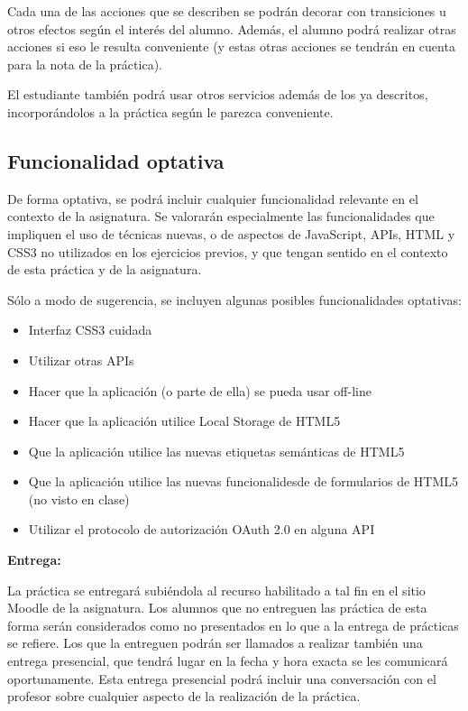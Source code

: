 Cada una de las acciones que se describen se podrán decorar con transiciones u otros efectos según el interés del alumno. Además, el alumno podrá realizar otras acciones si eso le resulta conveniente (y estas otras acciones se tendrán en cuenta para la nota de la práctica).

El estudiante también podrá usar otros servicios además de los ya descritos, incorporándolos a la práctica según le parezca conveniente.

\subsection{Funcionalidad optativa}

De forma optativa, se podrá incluir cualquier funcionalidad relevante en el contexto de la asignatura. Se valorarán especialmente las funcionalidades que impliquen el uso de técnicas nuevas, o de aspectos de JavaScript, APIs, HTML y CSS3 no utilizados en los ejercicios previos, y que tengan sentido en el contexto de esta práctica y de la asignatura.

Sólo a modo de sugerencia, se incluyen algunas posibles funcionalidades optativas:

\begin{itemize}
  \item Interfaz CSS3 cuidada
  \item Utilizar otras APIs
  \item Hacer que la aplicación (o parte de ella) se pueda usar off-line
  \item Hacer que la aplicación utilice Local Storage de HTML5
  \item Que la aplicación utilice las nuevas etiquetas semánticas de HTML5
  \item Que la aplicación utilice las nuevas funcionalidesde de formularios de HTML5 (no visto en clase)
  \item Utilizar el protocolo de autorización OAuth 2.0 en alguna API
\end{itemize}

\textbf{Entrega:}


La práctica se entregará subiéndola al recurso habilitado a tal fin en el sitio Moodle de la asignatura. Los alumnos que no entreguen las práctica de esta forma serán considerados como no presentados en lo que a la entrega de prácticas se refiere. Los que la entreguen podrán ser llamados a realizar también una entrega presencial, que tendrá lugar en la fecha y hora exacta se les comunicará oportunamente. Esta entrega presencial podrá incluir una conversación con el profesor sobre cualquier aspecto de la realización de la práctica.

